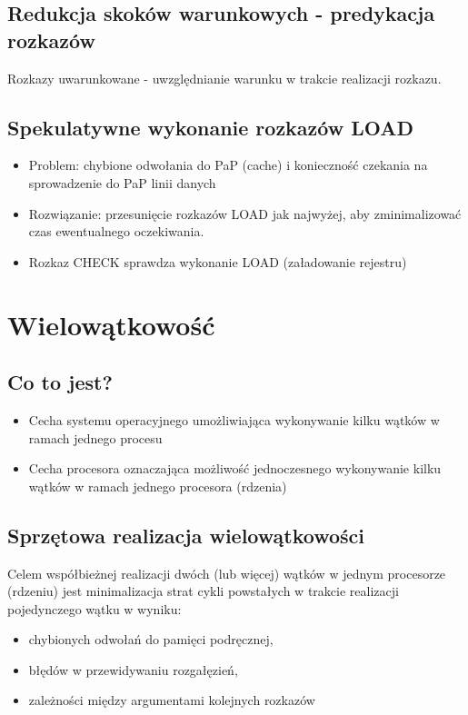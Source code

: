 		\subsection*{Redukcja skoków warunkowych - predykacja rozkazów}
		Rozkazy uwarunkowane - uwzględnianie warunku w trakcie realizacji rozkazu.
		\subsection*{Spekulatywne wykonanie rozkazów LOAD}
		\begin{itemize}
			\item Problem: chybione odwołania do PaP (cache) i konieczność czekania na sprowadzenie do PaP linii danych
			\item Rozwiązanie: przesunięcie rozkazów LOAD jak najwyżej, aby zminimalizować czas ewentualnego oczekiwania.
			\item Rozkaz CHECK sprawdza wykonanie LOAD (załadowanie rejestru)
		\end{itemize}
		
	\section*{Wielowątkowość}
		\subsection*{Co to jest?}
		\begin{itemize}
			\item Cecha systemu operacyjnego umożliwiająca wykonywanie kilku wątków w ramach jednego procesu
			\item Cecha procesora oznaczająca możliwość jednoczesnego wykonywanie kilku wątków w ramach jednego procesora (rdzenia)
		\end{itemize}
		\subsection*{Sprzętowa realizacja wielowątkowości}
		Celem współbieżnej realizacji dwóch (lub więcej) wątków w jednym procesorze (rdzeniu) jest minimalizacja strat cykli powstałych w trakcie realizacji pojedynczego wątku w wyniku:
		\begin{itemize}
			\item chybionych odwołań do pamięci podręcznej,
			\item błędów w przewidywaniu rozgałęzień,
			\item zależności między argumentami kolejnych rozkazów
		\end{itemize}
